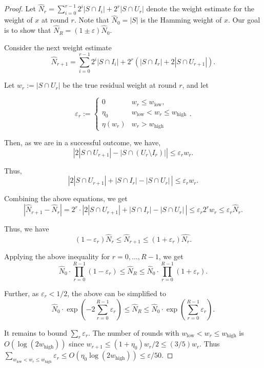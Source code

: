 \documentclass[10pt,a4paper]{amsart}
\DeclareMathOperator{\high}{\mathrm{high}}
\DeclareMathOperator{\low}{\mathrm{low}}
\renewcommand{\epsilon}{\varepsilon}
\begin{document}
\begin{proof}
Let $\widehat{N}_r = \sum_{i=0}^{r-1} 2^i |S \cap I_i| + 2^r |S \cap U_r|$ denote the weight estimate for the weight of $x$ at round $r$. Note that $\widehat{N}_0 = |S|$ is the Hamming weight of $x$. Our goal is to show that $\widehat{N}_R = (1\pm \varepsilon) \widehat{N}_0$. 

Consider the next weight estimate  $$\widehat{N}_{r+1} = \sum_{i=0}^{r-1} 2^i  |S \cap I_i| + 2^r (|S \cap I_r| + 2 |S \cap U_{r+1}|).$$

Let $w_r := |S \cap U_r|$ be the true residual weight at round $r$, and let 

$$
\epsilon_r := \begin{cases} 0 & w_r \leq w_{\low},\\
\eta_0 & w_{\low} < w_r \leq w_{\high}\\
\eta(w_r) & w_r > w_{\high}
\end{cases}.
$$

Then, as we are in a successful outcome, we have,
$$\left|2 |S \cap U_{r+1}| - |S \cap (U_r\setminus I_r)| \right| \leq \epsilon_r w_r.$$

Thus, 
$$\left| 2 |S \cap U_{r+1}| + |S \cap I_r|  - |S \cap U_r| \,\right| \leq \epsilon_r w_r.$$

Combining the above equations, we get 
$$|\widehat{N}_{r+1} - \widehat{N}_r| = 2^r \cdot \left| 2 |S \cap U_{r+1}| + |S \cap I_r|  - |S \cap U_r| \,\right| \leq \epsilon_r 2^r w_r \leq \epsilon_r \widehat{N}_r.$$

Thus, we have 
$$(1-\epsilon_r) \widehat{N}_r \leq \widehat{N}_{r+1} \leq (1+\epsilon_r) \widehat{N_r}.$$

Applying the above inequality for $r = 0,\ldots,R-1$, we get 
$$\widehat{N}_0  \cdot \prod_{r=0}^{R-1} (1-\epsilon_r) \leq \widehat{N}_R \leq \widehat{N}_0  \cdot \prod_{r=0}^{R-1} (1+\epsilon_r).$$

Further, as $\epsilon_r < 1/2$, the above can be simplified to 
\begin{equation}\label{eq:sparse1}
    \widehat{N}_0  \cdot \exp\left(-2 \sum_{r=0}^{R-1}\epsilon_r\right) \leq \widehat{N}_R \leq \widehat{N}_0  \cdot \exp\left( \sum_{r=0}^{R-1}\epsilon_r\right) .
\end{equation}

It remains to bound $\sum_r \epsilon_r$. The number of rounds with $w_{\low}<w_r\le w_{\high}$ is $O(\log(2w_{\high}))$ since
$w_{r+1}\le (1+\eta_0)w_r/2\le (3/5)w_r$.
Thus $\sum_{w_{\low}<w_r\le w_{\high}}\epsilon_r\le O(\eta_0\log(2w_{\high}))\le \varepsilon/50$.


\end{proof}
\end{document}
